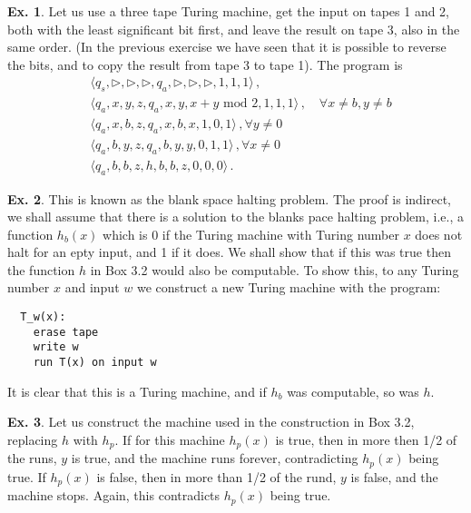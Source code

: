 \documentclass[a4paper,12pt]{article}
\theoremstyle{definition}
\newtheorem{exercise}{Ex.}[section]
\begin{document}
\begin{exercise}
 Let us use a three tape Turing machine, get the input on tapes 1 and 2, both with the least significant bit first, and leave the result on tape 3, also in the same order. (In the previous exercise we have seen that it is possible to reverse the bits, and to copy the result from tape 3 to tape 1). The program is
 \[
  \begin{aligned}
   &\langle q_s, \triangleright, \triangleright, \triangleright, q_{a}, \triangleright, \triangleright, \triangleright, 1, 1, 1\rangle\,,\\
   &\langle q_a, x, y, z, q_a, x, y, x + y \text{\ mod\ } 2, 1, 1, 1\rangle\,,\quad \forall x\ne b, y\ne b\\
   &\langle q_a, x, b, z, q_a, x, b, x, 1, 0, 1\rangle\,,\forall y\ne 0\\
   &\langle q_a, b, y, z, q_a, b, y, y, 0, 1, 1\rangle\,,\forall x\ne 0\\
   &\langle q_a, b, b, z, h, b, b, z, 0, 0, 0\rangle\,.
  \end{aligned}
 \]
\end{exercise}

\begin{exercise}
 This is known as the blank space halting problem. The proof is indirect, we shall assume that there is a solution to the blanks pace halting problem, i.e., a function $h_b(x)$ which is 0 if the Turing machine with Turing number $x$ does not halt for an epty input, and 1 if it does. We shall show that if this was true then the function $h$ in Box 3.2 would also be computable. To show this, to any Turing number $x$ and input $w$ we construct a new Turing machine with the program:
 \begin{verbatim}
  T_w(x):
    erase tape
    write w
    run T(x) on input w
 \end{verbatim}
 It is clear that this is a Turing machine, and if $h_b$ was computable, so was $h$.
\end{exercise}

\begin{exercise}
 Let us construct the machine used in the construction in Box 3.2, replacing $h$ with $h_p$. If for this machine $h_p(x)$ is true, then in more then 1/2 of the runs, $y$ is true, and the machine runs forever, contradicting $h_p(x)$ being true. If $h_p(x)$ is false, then in more than 1/2 of the rund, $y$ is false, and the machine stops. Again, this contradicts $h_p(x)$ being true.
\end{exercise}
\end{document}
